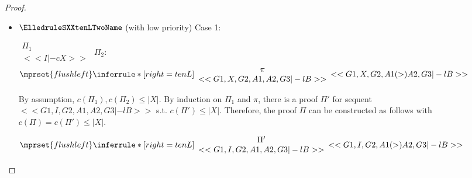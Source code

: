 \begin{proof}
\begin{enumerate}
\begin{itemize}
  \item $\ElledruleSXXtenLTwoName$ (with low priority) Case 1:
      \begin{center}
        \scriptsize
        \begin{math}
          \begin{array}{c}
            \Pi_1 \\
            {<<I |-c X>>}
          \end{array}
        \end{math}
        \qquad\qquad
        $\Pi_2$:
        \begin{math}
          $$\mprset{flushleft}
          \inferrule* [right={\tiny tenL}] {
            {
              \begin{array}{c}
                \pi \\
                {<<G1, X, G2, A1, A2, G3 |-l B>>}
              \end{array}
            }
          }{<<G1, X, G2, A1 (>) A2, G3 |-l B>>}
        \end{math}
      \end{center}
      By assumption, $c(\Pi_1),c(\Pi_2)\leq |X|$. By induction on $\Pi_1$ and $\pi$, there is
      a proof $\Pi'$ for sequent $<<G1, I, G2, A1, A2, G3 |-l B>>$ s.t. $c(\Pi') \leq |X|$.
      Therefore, the proof $\Pi$ can be constructed as follows with
      $c(\Pi) = c(\Pi') \leq |X|$.
      \begin{center}
        \scriptsize
        \begin{math}
          $$\mprset{flushleft}
          \inferrule* [right={\tiny tenL}] {
            {
              \begin{array}{c}
                \Pi' \\
                {<<G1, I, G2, A1, A2, G3 |-l B>>}
              \end{array}
            }
          }{<<G1, I, G2, A1 (>) A2, G3 |-l B>>}
        \end{math}
      \end{center}


\end{itemize}
\end{enumerate}
\end{proof}
